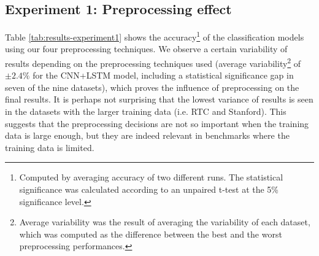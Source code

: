 \documentclass[11pt,a4paper]{article}
\begin{document}
\begin{table*}[t]
\begin{center}
{\begin{tabular}{c c l c  c  c  c c c c c c}
       \bottomrule
       
    \end{tabular}
    }
    \end{center}
    \caption{Accuracy on the topic categorization and polarity detection tasks using various preprocessing techniques for the CNN and CNN+LSTM models. $^\dagger$ indicates results that are statistically significant with respect to the top result. }
    \bigskip
    \label{tab:results-experiment1}
\end{table*}













\subsection{Experiment 1: Preprocessing effect}
\label{experiment1}


Table \ref{tab:results-experiment1} shows the accuracy\footnote{Computed by averaging accuracy of two different runs. The statistical significance was calculated according to an unpaired t-test at the 5\% significance level.} of the classification models using our four preprocessing techniques. 
We observe a certain variability of results depending on the preprocessing techniques used (average variability\footnote{Average variability was the result of averaging the variability of each dataset, which was computed as the difference between the best and the worst preprocessing performances.} of $\pm 2.4\%$ for the CNN+LSTM model, including a statistical significance gap in seven of the nine datasets), which proves the influence of preprocessing on the final results. It is perhaps not surprising that the lowest variance of results is seen in the datasets with the larger training data (i.e. RTC and Stanford). This suggests that the preprocessing decisions are not so important when the training data is large enough, but they are indeed relevant in benchmarks where the training data is limited.
\end{document}
